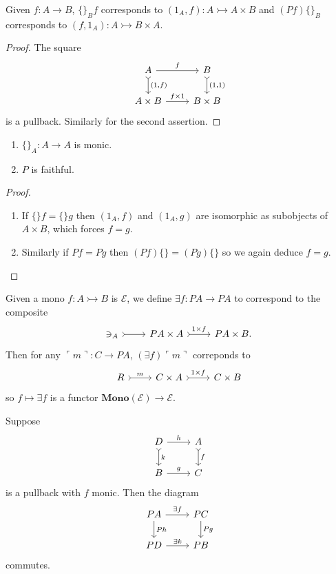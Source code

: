 \documentclass[a4paper]{article}
\renewcommand{\c}[1]{\mathbf{#1}}
\newcommand{\mono}{\rightarrowtail}
\begin{document}
\begin{lemma}
  Given \(f: A \to B\), \(\{\}_Bf\) corresponds to \((1_A, f): A \mono A \times B\) and \((Pf) \{\}_B\) corresponds to \((f, 1_A): A \mono B \times A\).
\end{lemma}

\begin{proof}
  The square
  \[
    \begin{tikzcd}
      A \ar[r, "f"] \ar[d, "{(1, f)}", tail] & B \ar[d, "{(1, 1)}", tail] \\
      A \times B \ar[r, "f \times 1"] & B \times B
    \end{tikzcd}
  \]
  is a pullback. Similarly for the second assertion.
\end{proof}

\begin{corollary}\leavevmode
  \begin{enumerate}
  \item \(\{\}_A: A \to A\) is monic.
  \item \(P\) is faithful.
  \end{enumerate}
\end{corollary}

\begin{proof}\leavevmode
  \begin{enumerate}
  \item If \(\{\}f = \{\}g\) then \((1_A, f)\) and \((1_A, g)\) are isomorphic as subobjects of \(A \times B\), which forces \(f = g\).
  \item Similarly if \(Pf = Pg\) then \((Pf)\{\} = (Pg)\{\}\) so we again deduce \(f = g\).
  \end{enumerate}
\end{proof}

Given a mono \(f: A \mono B\) is \(\mathcal E\), we define \(\exists f: PA \to PA\) to correspond to the composite
\[
  \begin{tikzcd}
    \ni_A \ar[r, tail] & PA \times A \ar[r, "1 \times f", tail] & PA \times B.
  \end{tikzcd}
\]
Then for any \(\ulcorner m \urcorner: C \to PA\), \((\exists f) \ulcorner m \urcorner\) correponds to
\[
  \begin{tikzcd}
    R \ar[r, "m", tail] & C \times A \ar[r, "1 \times f", tail] & C \times B
  \end{tikzcd}
\]
so \(f \mapsto \exists f\) is a functor \(\c{Mono}(\mathcal E) \to \mathcal E\).

\begin{lemma}
  Suppose
  \[
    \begin{tikzcd}
      D \ar[r, "h"] \ar[d, "k", tail] & A \ar[d, "f", tail] \\
      B \ar[r, "g"] & C
    \end{tikzcd}
  \]
  is a pullback with \(f\) monic. Then the diagram
  \[
    \begin{tikzcd}
      PA \ar[r, "\exists f"] \ar[d, "Ph"] & PC \ar[d, "Pg"] \\
      PD \ar[r, "\exists k"] & PB
    \end{tikzcd}
  \]
  commutes.
\end{lemma}
\end{document}
